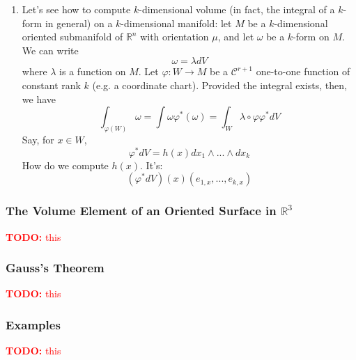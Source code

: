 \documentclass{article}
\newcommand{\reals}[0]{\mathbb{R}}
\newcommand{\mc}[1]{\mathcal{#1}}
\newcommand{\TODO}[1]{\textcolor{red}{\textbf{TODO:} #1}}
\begin{document}
\begin{enumerate}
  \item Let's see how to compute \(k\)-dimensional volume (in fact, the integral of a \(k\)-form in general) on a \(k\)-dimensional manifold: let \(M\) be a \(k\)-dimensional oriented submanifold of \(\reals^n\) with orientation \(\mu\), and let \(\omega\) be a \(k\)-form on \(M\). We can write
  \begin{equation}
    \omega = \lambda dV
  \end{equation}
  where \(\lambda\) is a function on \(M\). Let \(\varphi: W \to M\) be a \(\mc{C}^{r + 1}\) one-to-one function of constant rank \(k\) (e.g. a coordinate chart). Provided the integral exists, then, we have
  \begin{equation}
    \int_{\varphi(W)}\omega = \int\omega\varphi^*(\omega) = \int_W\lambda \circ \varphi\varphi^*dV
  \end{equation}
  Say, for \(x \in W\),
  \begin{equation}
    \varphi^*dV = h(x)dx_1 \wedge ... \wedge dx_k
  \end{equation}
  How do we compute \(h(x)\). It's:
  \begin{equation}
    (\varphi^*dV)(x)(e_{1,x},...,e_{k,x})
  \end{equation}

\end{enumerate}

\subsubsection{The Volume Element of an Oriented Surface in \(\reals^3\)}

\TODO{this}

\subsubsection{Gauss's Theorem}

\TODO{this}

\subsubsection{Examples}

\TODO{this}
\end{document}

